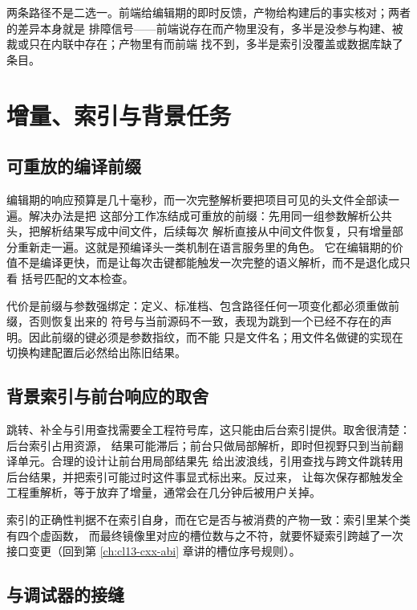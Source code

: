 \documentclass[12pt,a4paper,fontset=fandol]{ctexbook}
\begin{document}
两条路径不是二选一。前端给编辑期的即时反馈，产物给构建后的事实核对；两者的差异本身就是
排障信号——前端说存在而产物里没有，多半是没参与构建、被裁或只在内联中存在；产物里有而前端
找不到，多半是索引没覆盖或数据库缺了条目。

\section{增量、索引与背景任务}\label{sec:cl14-indexing}

\subsection{可重放的编译前缀}\label{sec:cl14-pch}

编辑期的响应预算是几十毫秒，而一次完整解析要把项目可见的头文件全部读一遍。解决办法是把
这部分工作冻结成可重放的前缀：先用同一组参数解析公共头，把解析结果写成中间文件，后续每次
解析直接从中间文件恢复，只有增量部分重新走一遍。这就是预编译头一类机制在语言服务里的角色。
它在编辑期的价值不是编译更快，而是让每次击键都能触发一次完整的语义解析，而不是退化成只看
括号匹配的文本检查。

代价是前缀与参数强绑定：定义、标准档、包含路径任何一项变化都必须重做前缀，否则恢复出来的
符号与当前源码不一致，表现为跳到一个已经不存在的声明。因此前缀的键必须是参数指纹，而不能
只是文件名；用文件名做键的实现在切换构建配置后必然给出陈旧结果。

\subsection{背景索引与前台响应的取舍}\label{sec:cl14-index}

跳转、补全与引用查找需要全工程符号库，这只能由后台索引提供。取舍很清楚：后台索引占用资源，
结果可能滞后；前台只做局部解析，即时但视野只到当前翻译单元。合理的设计让前台用局部结果先
给出波浪线，引用查找与跨文件跳转用后台结果，并把索引可能过时这件事显式标出来。反过来，
让每次保存都触发全工程重解析，等于放弃了增量，通常会在几分钟后被用户关掉。

索引的正确性判据不在索引自身，而在它是否与被消费的产物一致：索引里某个类有四个虚函数，
而最终镜像里对应的槽位数与之不符，就要怀疑索引跨越了一次接口变更（回到第
\ref{ch:cl13-cxx-abi} 章讲的槽位序号规则）。

\subsection{与调试器的接缝}\label{sec:cl14-debug}
\end{document}
